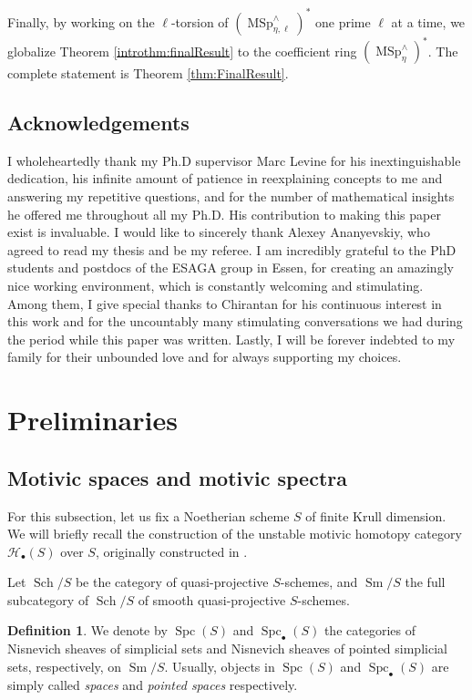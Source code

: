 \documentclass[10pt]{amsart}
\theoremstyle{definition}
\newtheorem{defn}{Definition}[section]
\theoremstyle{plain}
\numberwithin{equation}{section}
\newcommand{\0}{\emptyset}
\newcommand{\sH}{{\mathcal H}}
\newcommand{\MSp}{{\operatorname{MSp}}}
\newcommand{\Spc}{{\operatorname{Spc}}}
\newcommand{\Sm}{{\operatorname{Sm}}}
\newcommand{\Sch}{{\operatorname{Sch}}}
\begin{document}
Finally, by working on the $\ell$-torsion of $(\MSp_{\eta,\ell}^\wedge)^*$ one prime $\ell$ at a time, we globalize Theorem \ref{introthm:finalResult} to the coefficient ring $(\MSp_\eta^\wedge)^*$. The complete statement is Theorem \ref{thm:FinalResult}.

\subsection*{Acknowledgements}

I wholeheartedly thank my Ph.D supervisor Marc Levine for his inextinguishable dedication, his infinite amount of patience in reexplaining concepts to me and answering my repetitive questions, and for the number of mathematical insights he offered me throughout all my Ph.D. His contribution to making this paper exist is invaluable. I would like to sincerely thank Alexey Ananyevskiy, who agreed to read my thesis and be my referee. I am incredibly grateful to the PhD students and postdocs of the ESAGA group in Essen, for creating an amazingly nice working environment, which is constantly welcoming and stimulating. Among them, I give special thanks to Chirantan for his continuous interest in this work and for the uncountably many stimulating conversations we had during the period while this paper was written. Lastly, I will be forever indebted to my family for their unbounded love and for always supporting my choices.



\section{Preliminaries}

\subsection{Motivic spaces and motivic spectra}

For this subsection, let us fix a Noetherian scheme $S$ of finite Krull dimension. We will briefly recall the construction of the unstable motivic homotopy category $\sH_{\bullet}(S)$ over $S$, originally constructed in \cite{morvoe:homotopytheory}.

Let $\Sch/S$ be the category of quasi-projective $S$-schemes, and $\Sm/S$ the full subcategory of $\Sch/S$ of smooth quasi-projective $S$-schemes.
\begin{defn}
    We denote by $\Spc(S)$ and $\Spc_{\bullet}(S)$ the categories of Nisnevich sheaves of simplicial sets and Nisnevich sheaves of pointed simplicial sets, respectively, on $\Sm/S$. Usually, objects in $\Spc(S)$ and $\Spc_{\bullet}(S)$ are simply called \emph{spaces} and \emph{pointed spaces} respectively.
\end{defn}
\end{document}
